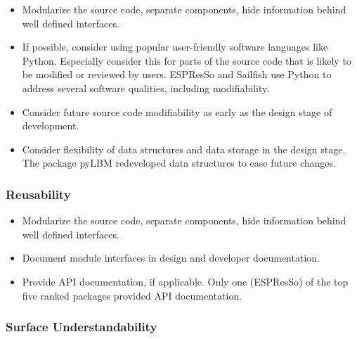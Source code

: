 \documentclass[12pt, notitlepage]{article}
\begin{document}
\begin{itemize}
	\item Modularize the source code, separate components, hide information behind well defined interfaces.
	\item If possible, consider using popular user-friendly software languages like Python. Especially consider this for parts of the source code that is likely to be modified or reviewed by users. ESPResSo and Sailfish use Python to address several software qualities, including modifiability.
	\item Consider future source code modifiability as early as the design stage of development.
	\item Consider flexibility of data structures and data storage in the design stage. The package pyLBM redeveloped data structures to ease future changes.
\end{itemize}

\subsubsection{Reusability}

\begin{itemize}
	\item Modularize the source code, separate components, hide information behind well defined interfaces.
	\item Document module interfaces in design and developer documentation. 
	\item Provide API documentation, if applicable. Only one (ESPResSo) of the top five ranked packages provided API documentation.
\end{itemize}

\subsubsection{Surface Understandability}
\end{document}
